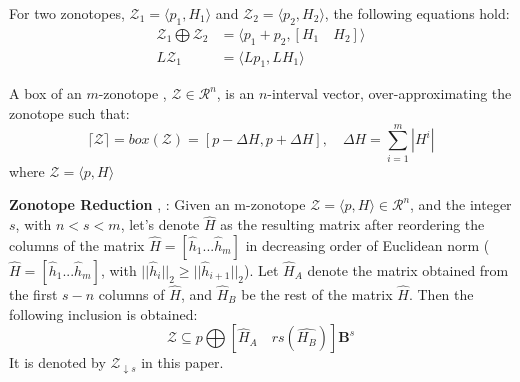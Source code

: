 \begin{lemma}
For two zonotopes, $\mathcal{Z}_1 = \langle p_1, H_1 \rangle$ and $\mathcal{Z}_2 = \langle p_2, H_2 \rangle$, the following equations hold:
\begin{equation}
\begin{split}
\mathcal{Z}_1 \bigoplus \mathcal{Z}_2 &= \langle p_1+p_2, [H_1 \quad H_2]\rangle \\
L\mathcal{Z}_1 &= \langle Lp_1, LH_1 \rangle 
\end{split}
\end{equation}
\end{lemma}
\begin{lemma} \cite{Althoff2010} \label{prop:overapprox}
A box of an $m$-zonotope , $\mathcal{Z} \in \mathcal{R}^n$, is an $n$-interval vector, over-approximating the zonotope such that:
\begin{equation}
\lceil \mathcal{Z} \rceil = box(\mathcal{Z}) = [ p - \Delta H , p+ \Delta H], \quad \Delta H = \sum^{m}_{i=1} |H^i| 
\end{equation}
where $\mathcal{Z} = \langle p, H \rangle$ 
\end{lemma}
\begin{lemma}
\textbf{Zonotope Reduction} \cite{Alamo2005}, \cite{Combastel2003}: Given an m-zonotope $\mathcal{Z} = \langle p, H \rangle \in \mathcal{R}^n$, and the integer $s$, with $n < s < m$, let's denote $\hat{H}$ as the resulting matrix after reordering the columns of the matrix $\hat{H}= [\hat{h}_1 ... \hat{h}_m]$ in decreasing order of Euclidean norm ($\hat{H}= [\hat{h}_1 ... \hat{h}_m]$, with $||\hat{h}_i||_2 \geq  ||\hat{h}_{i+1}||_2$). Let $\hat{H}_A$ denote the matrix obtained from the first $s-n$ columns of $\hat{H}$, and  $\hat{H}_B$ be the rest of the matrix $\hat{H}$. Then the following inclusion is obtained:
\begin{equation}
\mathcal{Z} \subseteq p \bigoplus [\hat{H}_A \quad rs(\hat{H_B})]\textbf{B}^s
\end{equation}
It is denoted by $\mathcal{Z}_{\downarrow s}$ in this paper.
\end{lemma}

